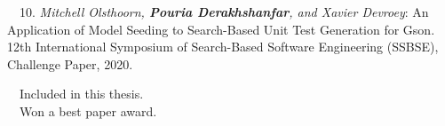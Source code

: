 \begin{etaremune}{\small
    \item[~~10.] \emph{Mitchell Olsthoorn, \textbf{Pouria Derakhshanfar}, and Xavier Devroey}: 
        An Application of Model Seeding to Search-Based Unit Test Generation for Gson.
        12th International Symposium of Search-Based Software Engineering (SSBSE), Challenge Paper,
        2020.
}\end{etaremune}
\noindent
\faFileTextO~~Included in this thesis.\\
\faTrophy~~Won a best paper award.
